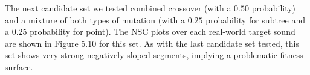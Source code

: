 \documentclass[12pt]{report} 	%
\numberwithin{figure}{chapter}
\numberwithin{table}{chapter}
\numberwithin{equation}{chapter}
\begin{document}
\begin{flushleft}
The next candidate set we tested combined crossover (with a $0.50$ probability) and a mixture of both types of mutation (with a $0.25$ probability for subtree and a $0.25$ probability for point). The NSC plots over each real-world target sound are shown in Figure 5.10 for this set.
As with the last candidate set tested, this set shows very strong negatively-sloped segments, implying a problematic fitness surface.


\end{flushleft}
\end{document}

